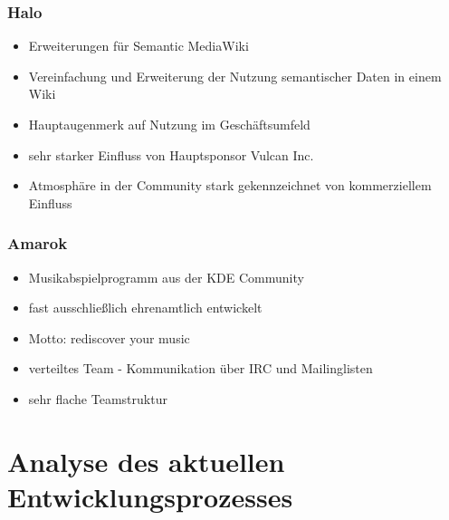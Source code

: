 \documentclass{beamer}
\begin{document}
\begin{frame}
\frametitle{Halo}
\begin{itemize}
 \item Erweiterungen f\"ur Semantic MediaWiki
 \item Vereinfachung und Erweiterung der Nutzung semantischer Daten in einem Wiki
 \item Hauptaugenmerk auf Nutzung im Gesch\"aftsumfeld
 \item sehr starker Einfluss von Hauptsponsor Vulcan Inc.
 \item Atmosph\"are in der Community stark gekennzeichnet von kommerziellem Einfluss
\end{itemize}
\end{frame}

\begin{frame}
\frametitle{Amarok}
\begin{itemize}
 \item Musikabspielprogramm aus der KDE Community
 \item fast ausschlie\ss lich ehrenamtlich entwickelt
 \item Motto: rediscover your music
 \item verteiltes Team - Kommunikation \"uber IRC und Mailinglisten
 \item sehr flache Teamstruktur
\end{itemize}
\end{frame}

\section{Analyse des aktuellen Entwicklungsprozesses}
\end{document}
